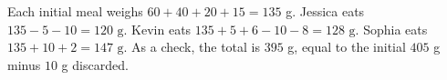 Each initial meal weighs $ 60+40+20+15=135 $ g. Jessica eats $ 135-5-10=\boxed{120\text{ g}}$. Kevin eats $ 135+5+6-10-8=\boxed{128\text{ g}}$. Sophia eats $ 135+10+2=\boxed{147\text{ g}}$. As a check, the total is $ 395 $ g, equal to the initial $ 405 $ g minus $ 10 $ g discarded.
